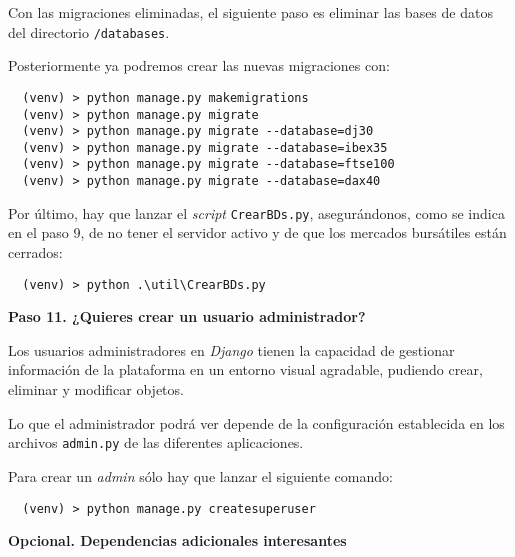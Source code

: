 Con las migraciones eliminadas, el siguiente paso es eliminar las bases de datos del directorio \texttt{/databases}.

Posteriormente ya podremos crear las nuevas migraciones con:

\begin{verbatim}
  (venv) > python manage.py makemigrations
  (venv) > python manage.py migrate
  (venv) > python manage.py migrate --database=dj30
  (venv) > python manage.py migrate --database=ibex35
  (venv) > python manage.py migrate --database=ftse100
  (venv) > python manage.py migrate --database=dax40
\end{verbatim}

Por último, hay que lanzar el \emph{script} \texttt{CrearBDs.py}, asegurándonos, como se indica en el paso 9, de no tener el servidor activo y de que los mercados bursátiles están cerrados:

\begin{verbatim}
  (venv) > python .\util\CrearBDs.py
\end{verbatim}



\textbf{Paso 11. ¿Quieres crear un usuario administrador?}

Los usuarios administradores en \emph{Django} tienen la capacidad de gestionar información de la plataforma en un entorno visual agradable, pudiendo crear, eliminar y modificar objetos.

Lo que el administrador podrá ver depende de la configuración establecida en los archivos \texttt{admin.py} de las diferentes aplicaciones.

Para crear un \emph{admin} sólo hay que lanzar el siguiente comando:

\begin{verbatim}
  (venv) > python manage.py createsuperuser
\end{verbatim}



\textbf{Opcional. Dependencias adicionales interesantes}

